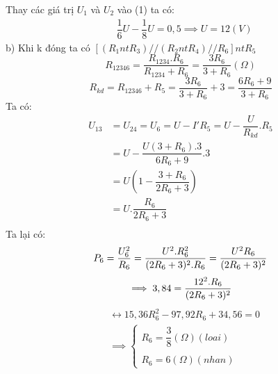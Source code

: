 \documentclass[50pt]{article}
\begin{document}
Thay các giá trị $U_{1}$ và $U_{2}$ vào (1) ta có:\\
\begin{equation*}
    \begin{aligned}
        & \dfrac{1}{6}U - \dfrac{1}{8}U = 0,5
        \implies U = 12 (V)
    \end{aligned}
\end{equation*}
b) Khi k đóng ta có $[(R_{1} nt R_{3}) // (R_{2} nt R_{4}) // R_{6}] nt R_{5}$\\
\begin{equation*}
    R_{12346} = \dfrac{R_{1234}.R_{6}}{R_{1234} + R_{6}} = \dfrac{3R_{6}}{3 + R_{6}} (\Omega)
\end{equation*}
\begin{equation*}
    R_{kd} = R_{12346} + R_{5} = \dfrac{3R_{6}}{3 + R_{6}} + 3 = \dfrac{6R_{6} + 9}{3 + R_{6}}
\end{equation*}
Ta có:
\begin{equation*}
    \begin{aligned}
        U_{13} & = U_{24} = U_{6} = U - I'R_{5} = U - \dfrac{U}{R_{kd}}.R_{5} \\
               & = U - \dfrac{U(3 + R_{6}).3}{6R_{6} + 9}.3 \\
               & = U(1 - \dfrac{3 + R_{6}}{2R_{6} + 3}) \\
               & = U.\dfrac{R_{6}}{2R_{6} + 3} \\
    \end{aligned}
\end{equation*}
Ta lại có:
\begin{equation*}
P_{6} = \dfrac{U_{6}^2}{R_{6}} = \dfrac{U^2.R_{6}^2}{(2R_{6} + 3)^2.R_{6}} = \dfrac{U^2R_{6}}{(2R_{6} + 3)^2}\\
\end{equation*}
\begin{equation*}
    \implies 3,84 = \dfrac{12^2.R_{6}}{(2R_{6} + 3)^2}\\
\end{equation*}
\begin{equation*}
    \begin{aligned}
        & \leftrightarrow 15,36R_{6}^2 - 97,92R_{6} + 34,56 = 0\\
        & \implies \begin{cases}
            R_{6} = \dfrac{3}{8} (\Omega) (loai)\\
            \\
            R_{6} = 6 (\Omega) (nhan)
        \end{cases}
    \end{aligned}
\end{equation*}
\end{document}
